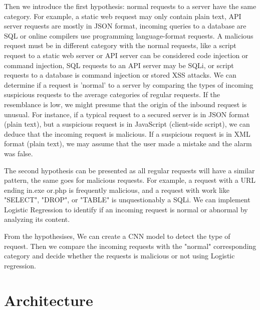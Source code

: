 Then we introduce the first hypothesis: normal requests to a server have the same category. For example, a static web request may only contain plain text, API server requests are mostly in JSON format, incoming queries to a database are SQL or online compilers use programming language-format requests. A malicious request must be in different category with the normal requests, like a script request to a static web server or API server can be considered code injection or command injection, SQL requests to an API server may be SQLi, or script requests to a database is command injection or stored XSS attacks. We can determine if a request is 'normal' to a server by comparing the types of incoming suspicious requests to the average categories of regular requests. If the resemblance is low, we might presume that the origin of the inbound request is unusual. For instance, if a typical request to a secured server is in JSON format (plain text), but a suspicious request is in JavaScript (client-side script), we can deduce that the incoming request is malicious. If a suspicious request is in XML format (plain text), we may assume that the user made a mistake and the alarm was false.



The second hypothesis can be presented as all regular requests will have a similar pattern, the same goes for malicious requests. For example, a request with a URL ending in.exe or.php is frequently malicious, and a request with work like "SELECT", "DROP", or "TABLE" is unquestionably a SQLi. We can implement Logistic Regression to identify if an incoming request is normal or abnormal by analyzing its content.

From the hypothesises, We can create a CNN model to detect the type of request. Then we compare the incoming requests with the "normal" corresponding category and decide whether the requests is malicious or not using Logistic regression.


\section{Architecture}
\label{architecture design}

